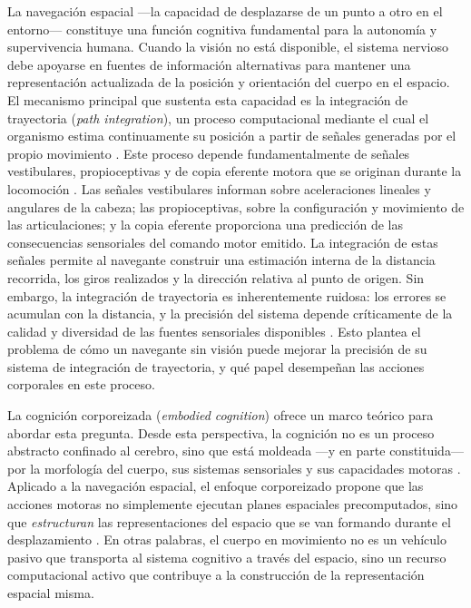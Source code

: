 \documentclass[12pt,letterpaper]{article}
\begin{document}
La navegación espacial ---la capacidad de desplazarse de un punto a otro en el entorno--- constituye una función cognitiva fundamental para la autonomía y supervivencia humana. Cuando la visión no está disponible, el sistema nervioso debe apoyarse en fuentes de información alternativas para mantener una representación actualizada de la posición y orientación del cuerpo en el espacio. El mecanismo principal que sustenta esta capacidad es la integración de trayectoria (\textit{path integration}), un proceso computacional mediante el cual el organismo estima continuamente su posición a partir de señales generadas por el propio movimiento \parencite{OKeefe1978,Loomis2012}. Este proceso depende fundamentalmente de señales vestibulares, propioceptivas y de copia eferente motora que se originan durante la locomoción \parencite{Cullen2019}. Las señales vestibulares informan sobre aceleraciones lineales y angulares de la cabeza; las propioceptivas, sobre la configuración y movimiento de las articulaciones; y la copia eferente proporciona una predicción de las consecuencias sensoriales del comando motor emitido. La integración de estas señales permite al navegante construir una estimación interna de la distancia recorrida, los giros realizados y la dirección relativa al punto de origen. Sin embargo, la integración de trayectoria es inherentemente ruidosa: los errores se acumulan con la distancia, y la precisión del sistema depende críticamente de la calidad y diversidad de las fuentes sensoriales disponibles \parencite{Loomis2012,Zhou2022}. Esto plantea el problema de cómo un navegante sin visión puede mejorar la precisión de su sistema de integración de trayectoria, y qué papel desempeñan las acciones corporales en este proceso.

La cognición corporeizada (\textit{embodied cognition}) ofrece un marco teórico para abordar esta pregunta. Desde esta perspectiva, la cognición no es un proceso abstracto confinado al cerebro, sino que está moldeada ---y en parte constituida--- por la morfología del cuerpo, sus sistemas sensoriales y sus capacidades motoras \parencite{Shapiro2019,Wilson2002}. Aplicado a la navegación espacial, el enfoque corporeizado propone que las acciones motoras no simplemente ejecutan planes espaciales precomputados, sino que \textit{estructuran} las representaciones del espacio que se van formando durante el desplazamiento \parencite{HerasEscribano2021}. En otras palabras, el cuerpo en movimiento no es un vehículo pasivo que transporta al sistema cognitivo a través del espacio, sino un recurso computacional activo que contribuye a la construcción de la representación espacial misma.
\end{document}
